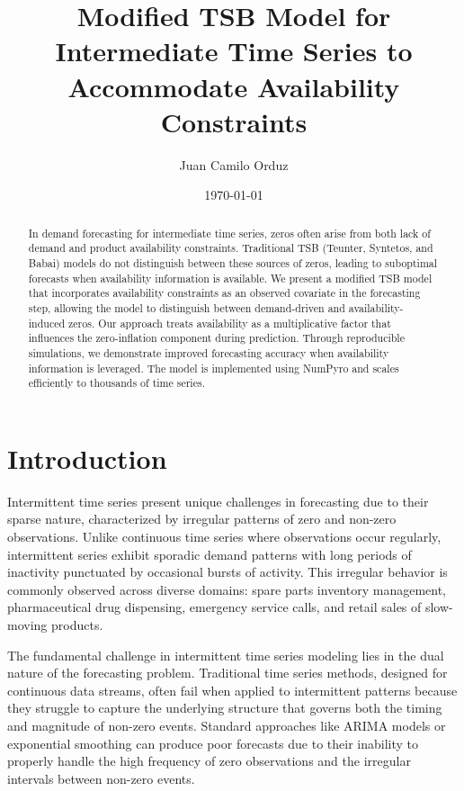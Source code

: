 \documentclass[11pt]{amsart}
\theoremstyle{definition}
\begin{document}
\title{Modified TSB Model for Intermediate Time Series to Accommodate Availability Constraints}
\author{Juan Camilo Orduz}
\address{Berlin, Germany}
\date{\today}

\begin{abstract}
    In demand forecasting for intermediate time series, zeros often arise from both lack of demand and product 
    availability constraints. Traditional TSB (Teunter, Syntetos, and Babai) models do not distinguish between 
    these sources of zeros, leading to suboptimal forecasts when availability information is available. We present 
    a modified TSB model that incorporates availability constraints as an observed covariate in the forecasting 
    step, allowing the model to distinguish between demand-driven and availability-induced zeros. Our approach 
    treats availability as a multiplicative factor that influences the zero-inflation component during prediction. 
    Through reproducible simulations, we demonstrate improved forecasting accuracy when availability information 
    is leveraged. The model is implemented using NumPyro and scales efficiently to thousands of time series.
\end{abstract}

\maketitle

\section{Introduction}

Intermittent time series present unique challenges in forecasting due to their sparse nature, characterized by irregular 
patterns of zero and non-zero observations. Unlike continuous time series where observations occur regularly, intermittent 
series exhibit sporadic demand patterns with long periods of inactivity punctuated by occasional bursts of activity. 
This irregular behavior is commonly observed across diverse domains: spare parts inventory management, pharmaceutical 
drug dispensing, emergency service calls, and retail sales of slow-moving products.

The fundamental challenge in intermittent time series modeling lies in the dual nature of the forecasting problem. 
Traditional time series methods, designed for continuous data streams, often fail when applied to intermittent patterns 
because they struggle to capture the underlying structure that governs both the timing and magnitude of non-zero events. 
Standard approaches like ARIMA models or exponential smoothing can produce poor forecasts due to their inability to 
properly handle the high frequency of zero observations and the irregular intervals between non-zero events.
\end{document}
